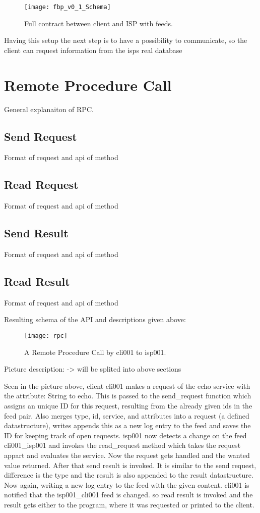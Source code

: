 \begin{figure}
    \centering
    \texttt{[image: fbp\_v0\_1\_Schema]}
    \caption{Full contract between client and ISP with feeds.}
    \label{fig:contract_cli_isp}
\end{figure}

Having this setup the next step is to have a possibility to communicate, so the client can request information from the isps real database

\pagebreak
\section{Remote Procedure Call}
General explanaiton of RPC.

\subsection{Send Request}
Format of request and api of method
\subsection{Read Request}
Format of request and api of method
\subsection{Send Result}
Format of request and api of method
\subsection{Read Result}
Format of request and api of method

Resulting schema of the API and descriptions given above:

\begin{figure}
    \centering
    \texttt{[image: rpc]}
    \caption{A Remote Procedure Call by cli001 to isp001.}
    \label{fig:contract_cli_isp}
\end{figure}


Picture description: -> will be splited into above sections

Seen in the picture above, client cli001 makes a request of the echo service with the attribute: String to echo. This is passed to the send\_request function which assigns an unique ID for this request, resulting from the already given ids in the feed pair. Also merges type, id, service, and attributes into a request (a defined datastructure), writes appends this as a new log entry to the feed and saves the ID for keeping track of open requests. isp001 now detects a change on the feed cli001\_isp001 and invokes the read\_request method which takes the request appart and evaluates the service. Now the request gets handled and the wanted value returned. After that send result is invoked. It is similar to the send request, difference is the type and the result is also appended to the result datastructure. Now again, writing a new log entry to the feed with the given content. cli001 is notified that the isp001\_cli001 feed is changed. so read result is invoked and the result gets either to the program, where it was requested or printed to the client.

